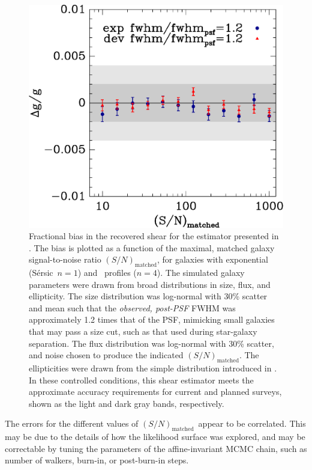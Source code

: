\documentclass[usegraphicx,usenatbib]{mn2e}
\newcommand{\Msn}{$(S/N)_{\textrm{matched}}$}
\newcommand{\sersic}{S\'{e}rsic}
\newcommand{\lognormscatt}{30}
\begin{document}
\begin{figure}
 \includegraphics[scale=0.45]{figures/ngmix-fwhm1.2.eps}
 \caption{ Fractional bias in the recovered shear for the estimator presented
     in \citet{ba14}.  The bias is plotted as a function of the maximal, matched
     galaxy signal-to-noise ratio \Msn, for galaxies with exponential (\sersic\
     $n=1$) and \devauc\ profiles ($n=4$).  The simulated galaxy parameters
     were drawn from broad distributions in size, flux, and ellipticity.  The
     size distribution was log-normal with \lognormscatt\% scatter and mean
     such that the {\it observed, post-PSF} FWHM was approximately 1.2 times
     that of the PSF, mimicking small galaxies that may pass a size
     cut, such as that used during star-galaxy separation.  The flux
     distribution was log-normal with \lognormscatt\% scatter, and noise chosen
     to produce the indicated \Msn.  The ellipticities were
     drawn from the simple distribution introduced in \citet{ba14}. In these
     controlled conditions, this shear estimator meets the approximate accuracy
 requirements for current and planned surveys, shown as the light and dark gray bands,
 respectively.}
 \label{fig:fracerr}
\end{figure}

The errors for the different values of \Msn\ appear to be correlated.  This may
be due to the details of how the likelihood surface was explored, and may be
correctable by tuning the parameters of the affine-invariant MCMC chain, such
as number of walkers, burn-in, or post-burn-in steps.
\end{document}
